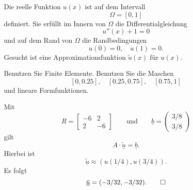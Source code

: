 Die reelle Funktion $u(x)$ ist auf dem Intervall
\[
\Omega = [0, 1]
\]
definiert. Sie erfüllt im Innern von $\Omega$ die Differentialgleichung 
\[
u''(x) + 1 = 0
\]
und auf dem Rand von $\Omega$ die Randbedingungen 
\[
u(0) = 0,
\quad
u(1) = 0.
\]
Gesucht ist eine Approximationsfunktion $\tilde u(x)$ für $u(x)$.

Benutzen Sie Finite Elemente. Benutzen Sie die Maschen
\[
[0,0.25],
\quad
[0.25, 0.75],
\quad
[0.75, 1]
\]
und lineare Formfunktionen.

\begin{loesung}
Mit 
\[
R
=
\left[\begin{array}{rr} -6 & 2 \\ 2 & -6 \end{array}\right]
\qquad
\text{und}
\qquad
\underline{b} =  \left(\begin{array}{r} 3/8 \\ 3/8 \end{array}\right)
\]
gilt  
\[
A \cdot \underline{\tilde u} = \underline{b}.
\]
Hierbei ist
\[
\underline{\tilde u} \approx (u(1/4), u(3/4)).
\]
Es folgt 
\[
\underline{\tilde u} = (-3/32, -3/32).
\qedhere
\]
\end{loesung}

